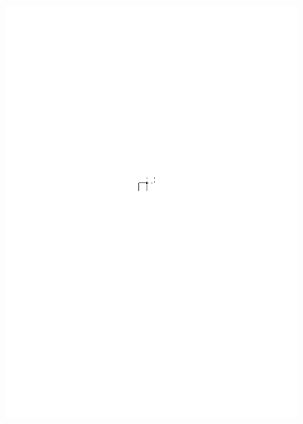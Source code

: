 \documentclass[a4paper]{scrreprt}
\theoremstyle{definition}
\begin{document}
\begin{figure}[h]
            {\includegraphics[scale=.8]{oc3_embed/incoming/indeg2}}
        \quad

\end{figure}
\end{document}
